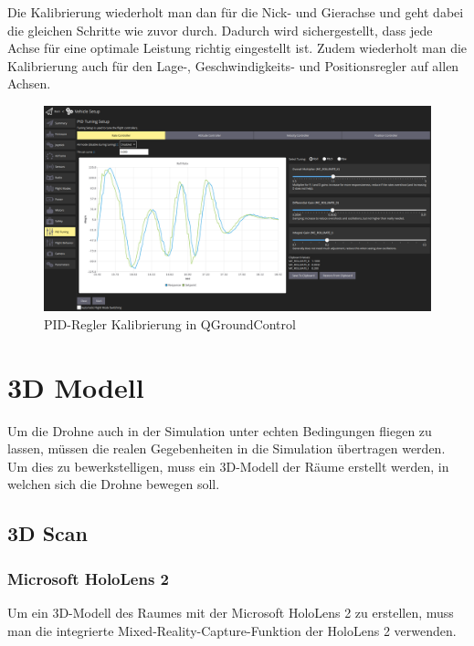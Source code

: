 Die Kalibrierung wiederholt man dan für die Nick- und Gierachse und geht dabei die gleichen Schritte wie zuvor durch. Dadurch wird sichergestellt, dass jede Achse für eine optimale Leistung richtig eingestellt ist. Zudem wiederholt man die Kalibrierung auch für den Lage-, Geschwindigkeits- und Positionsregler auf allen Achsen.
\begin{figure}[H]
    \includegraphics[width=\textwidth]{./images/qgc_mc_pid_tuning_rate_controller.950965c8.png}
    \caption{PID-Regler Kalibrierung in QGroundControl}\label{fig:accelerometer-calibration}
\end{figure}

\section{3D Modell} \label{3d_modell:section}
Um die Drohne auch in der Simulation unter echten Bedingungen fliegen zu lassen, müssen die realen Gegebenheiten in die Simulation übertragen werden. Um dies zu bewerkstelligen, muss ein 3D-Modell der Räume erstellt werden, in welchen sich die Drohne bewegen soll.
    \subsection{3D Scan} \label{3d-scan:subsection}

        \subsubsection{Microsoft HoloLens 2} \label{hololens:subsubsection}
        Um ein 3D-Modell des Raumes mit der Microsoft HoloLens 2 zu erstellen, muss man die integrierte Mixed-Reality-Capture-Funktion der HoloLens 2 verwenden.
        
